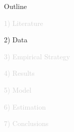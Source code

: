 \documentclass[aspectratio=169]{beamer}
\begin{document}

\begin{frame}[noframenumbering]{Outline}

\Large

\textcolor{lightgray}{1) Literature}

\vspace{4mm}

2) Data

\vspace{4mm}

\textcolor{lightgray}{3) Empirical Strategy}

\vspace{4mm}

\textcolor{lightgray}{4) Results}

\vspace{4mm}

\textcolor{lightgray}{5) Model}

\vspace{4mm}

\textcolor{lightgray}{6) Estimation}

\vspace{4mm}

\textcolor{lightgray}{7) Conclusions}

\end{frame}

\end{document}
